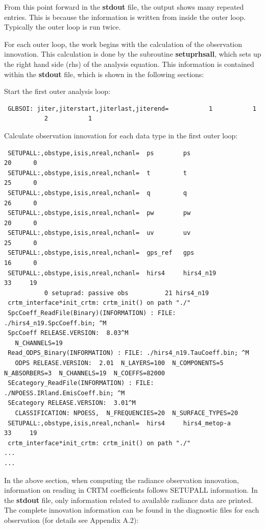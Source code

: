 From this point forward in the \textbf{stdout} file, the output shows many repeated entries. This is because the information is written from inside the outer loop. Typically the outer loop is run twice.

For each outer loop, the work begins with the calculation of the observation innovation. This calculation is done by the subroutine \textbf{setuprhsall}, which sets up the right hand side (rhs) of the analysis equation. This information is contained within the \textbf{stdout} file, which is shown in the following sections: 

Start the first outer analysis loop:

\begin{scriptsize}
\begin{verbatim}
 GLBSOI: jiter,jiterstart,jiterlast,jiterend=           1           1
           2           1
\end{verbatim}
\end{scriptsize}
Calculate observation innovation for each data type in the first outer loop:

\begin{scriptsize}
\begin{verbatim} 
 SETUPALL:,obstype,isis,nreal,nchanl=  ps        ps                       20      0
 SETUPALL:,obstype,isis,nreal,nchanl=  t         t                        25      0
 SETUPALL:,obstype,isis,nreal,nchanl=  q         q                        26      0
 SETUPALL:,obstype,isis,nreal,nchanl=  pw        pw                       20      0
 SETUPALL:,obstype,isis,nreal,nchanl=  uv        uv                       25      0
 SETUPALL:,obstype,isis,nreal,nchanl=  gps_ref   gps                      16      0
 SETUPALL:,obstype,isis,nreal,nchanl=  hirs4     hirs4_n19                33     19
           0 setuprad: passive obs          21 hirs4_n19
 crtm_interface*init_crtm: crtm_init() on path "./"
 SpcCoeff_ReadFile(Binary)(INFORMATION) : FILE: ./hirs4_n19.SpcCoeff.bin; ^M
 SpcCoeff RELEASE.VERSION:  8.03^M
   N_CHANNELS=19
 Read_ODPS_Binary(INFORMATION) : FILE: ./hirs4_n19.TauCoeff.bin; ^M
   ODPS RELEASE.VERSION:  2.01  N_LAYERS=100  N_COMPONENTS=5  N_ABSORBERS=3  N_CHANNELS=19  N_COEFFS=82000
 SEcategory_ReadFile(INFORMATION) : FILE: ./NPOESS.IRland.EmisCoeff.bin; ^M
 SEcategory RELEASE.VERSION:  3.01^M
   CLASSIFICATION: NPOESS,  N_FREQUENCIES=20  N_SURFACE_TYPES=20
 SETUPALL:,obstype,isis,nreal,nchanl=  hirs4     hirs4_metop-a            33     19
 crtm_interface*init_crtm: crtm_init() on path "./"
...
...
\end{verbatim}
\end{scriptsize}
In the above section, when computing the radiance observation innovation, information on reading in CRTM coefficients follows SETUPALL information. In the \textbf{stdout} file, only information related to available radiance data are printed. The complete innovation information can be found in the diagnostic files for each observation (for details see Appendix A.2): 

